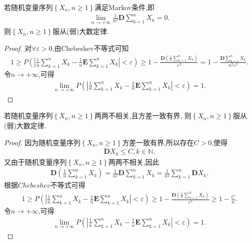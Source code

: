 \documentclass[lang=cn,newtx,10pt,sCheme=Chinese,citestyle=gb7714-2015, bibstyle=gb7714-2015]{../../Template/elegantbook}
\begin{document}
\begin{theorem}[Markov大数定律]\label{theorem:Markov大数定律}
若随机变量序列$\left\{ X_n,n\geqslant 1 \right\}$满足Markov条件,即
\begin{align*}
\underset{n\rightarrow +\infty}{\lim}\frac{1}{n^2}\boldsymbol{D}\sum_{k=1}^n{X_k}=0.
\end{align*}
则$\left\{ X_n,n\geqslant 1 \right\}$服从(弱)大数定律.
\end{theorem}
\begin{proof}

对$\forall \varepsilon>0$,由Chebeshev不等式可知
\begin{align*}
1\geqslant P\left( \left| \frac{1}{n}\sum_{k=1}^n{X_k}-\frac{1}{n}\boldsymbol{E}\sum\limits_{k=1}^n{X_k} \right|<\varepsilon \right) \geqslant 1-\frac{\boldsymbol{D}\left( \frac{1}{n}\sum\limits_{k=1}^n{X_k} \right)}{\varepsilon ^2}=1-\frac{\boldsymbol{D}\sum\limits_{k=1}^n{X_k}}{n^2\varepsilon ^2}.
\end{align*}
令$n\to +\infty$,可得
\begin{align*}
\underset{n\rightarrow +\infty}{\lim}P\left( \left| \frac{1}{n}\sum_{k=1}^n{X_k}-\frac{1}{n}\boldsymbol{E}\sum_{k=1}^n{X_k} \right|<\varepsilon \right) =1.
\end{align*}

\end{proof}

\begin{theorem}[Chebeshev大数定律]\label{theorem:Chebeshev大数定律}
若随机变量序列$\left\{ X_n,n\geqslant 1 \right\}$两两不相关,且方差一致有界,
则$\left\{ X_n,n\geqslant 1 \right\}$服从(弱)大数定律.
\end{theorem}
\begin{proof}

因为随机变量序列$\left\{ X_n,n\geqslant 1 \right\}$方差一致有界,所以存在$C>0$,使得
\begin{align*}
\boldsymbol{D}X_k\leqslant C,k\in \mathbb{N}.
\end{align*}
又由于随机变量序列$\left\{ X_n,n\geqslant 1 \right\}$两两不相关,因此
\begin{align*}
\boldsymbol{D}\left( \frac{1}{n}\sum_{k=1}^n{X_k} \right) =\frac{1}{n^2}\boldsymbol{D}\sum_{k=1}^n{X_k}=\frac{1}{n^2}\sum_{k=1}^n{\boldsymbol{D}X_k}.
\end{align*}
根据$Chebeshev$不等式可得
\begin{align*}
1\geqslant P\left( \left| \frac{1}{n}\sum_{k=1}^n{X_k}-\frac{1}{n}\boldsymbol{E}\sum_{k=1}^n{X_k} \right|<\varepsilon \right) \geqslant 1-\frac{\boldsymbol{D}\left( \frac{1}{n}\sum\limits_{k=1}^n{X_k} \right)}{\varepsilon ^2}\geqslant 1-\frac{C}{n}.
\end{align*}
令$n\to +\infty$,可得
\begin{align*}
\underset{n\rightarrow +\infty}{\lim}P\left( \left| \frac{1}{n}\sum_{k=1}^n{X_k}-\frac{1}{n}\boldsymbol{E}\sum_{k=1}^n{X_k} \right|<\varepsilon \right) =1.
\end{align*}

\end{proof}
\end{document}
